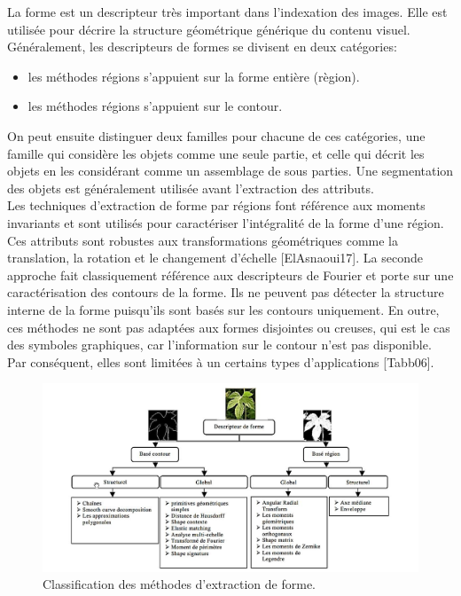 La forme est un descripteur très important dans l'indexation des images. Elle est utilisée pour décrire la structure géométrique générique du contenu visuel. Généralement, les descripteurs de formes se divisent en deux catégories: 
\begin{itemize}
	\item les méthodes régions s'appuient sur la forme entière (règion). 
	\item les méthodes régions s'appuient sur le contour.
\end{itemize}
On peut ensuite distinguer deux familles pour chacune de ces catégories, une famille qui considère les objets comme une seule partie, et celle qui décrit les objets en les considérant comme un assemblage de sous parties. Une segmentation des objets est généralement utilisée avant l'extraction des attributs.\\

Les techniques d’extraction de forme par régions font référence aux moments invariants et sont utilisés pour caractériser l’intégralité de la forme d’une région. Ces attributs sont robustes aux transformations géométriques comme la translation, la rotation et le changement d’échelle [ElAsnaoui17]. La seconde approche fait classiquement référence aux descripteurs de Fourier et porte sur une caractérisation des contours de la forme. Ils ne peuvent pas détecter la structure interne de la forme puisqu’ils sont basés sur les contours uniquement. En outre, ces méthodes ne sont pas adaptées aux formes disjointes ou creuses, qui est le cas des symboles graphiques, car l’information sur le contour n’est pas disponible. Par conséquent, elles sont limitées à un certains types d’applications [Tabb06].

\begin{figure}[H]
	\label{fig:forme}
	\centering
	\includegraphics[width=1\textwidth]{Figures/forme} %
	
	\caption{Classification des méthodes d'extraction de forme.}
	
\end{figure}

